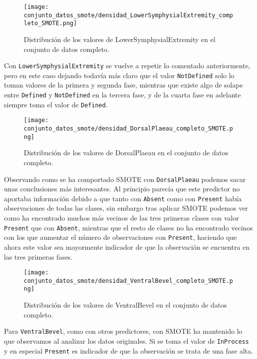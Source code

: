 \begin{figure}[H]
	\centering
	\texttt{[image: conjunto\_datos\_smote/densidad\_LowerSymphysialExtremity\_completo\_SMOTE.png]}
	\caption{Distribución de los valores de LowerSymphysialExtremity en el conjunto de datos completo.}
	\label{fig:densidad_LowerSymphysialExtremity_completo_smote}
\end{figure}

Con \texttt{LowerSymphysialExtremity} se vuelve a repetir lo comentado anteriormente, pero en este caso dejando todavía más claro que el valor \texttt{NotDefined} solo lo toman valores de la primera y segunda fase, mientras que existe algo de solape entre \texttt{Defined} y \texttt{NotDefined} en la tercera fase, y de la cuarta fase en adelante siempre toma el valor de \texttt{Defined}.

\begin{figure}[H]
	\centering
	\texttt{[image: conjunto\_datos\_smote/densidad\_DorsalPlaeau\_completo\_SMOTE.png]}
	\caption{Distribución de los valores de DorsalPlaeau en el conjunto de datos completo.}
	\label{fig:densidad_DorsalPlaeau_completo_smote}
\end{figure}

Observando como se ha comportado SMOTE con \texttt{DorsalPlaeau} podemos sacar unas conclusiones más interesantes. Al principio parecía que este predictor no aportaba información debido a que tanto con \texttt{Absent} como con \texttt{Present} había observaciones de todas las clases, sin embargo tras aplicar SMOTE podemos ver como ha encontrado muchos más vecinos de las tres primeras clases con valor \texttt{Present} que con \texttt{Absent}, mientras que el resto de clases no ha encontrado vecinos con los que aumentar el número de observaciones con \texttt{Present}, haciendo que ahora este valor sea mayormente indicador de que la observación se encuentra en las tres primeras fases.

\begin{figure}[H]
	\centering
	\texttt{[image: conjunto\_datos\_smote/densidad\_VentralBevel\_completo\_SMOTE.png]}
	\caption{Distribución de los valores de VentralBevel en el conjunto de datos completo.}
	\label{fig:densidad_VentralBevel_completo_smote}
\end{figure}

Para \texttt{VentralBevel}, como con otros predictores, con SMOTE ha mantenido lo que observamos al analizar los datos originales. Si se toma el valor de \texttt{InProcess} y en especial \texttt{Present} es indicador de que la observación se trata de una fase alta.


